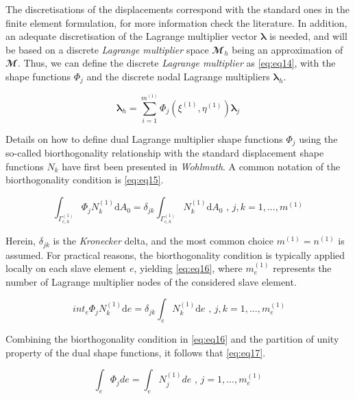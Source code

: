 \documentclass[a4paper,10pt]{article} %
\begin{document}
The discretisations of the displacements correspond with the standard ones in the finite element formulation, for more information check the literature\cite{Zienkiewicz1}. In addition, an adequate discretisation of the Lagrange multiplier vector $\boldsymbol{\lambda}$ is needed, and will be based on a discrete \textit{Lagrange multiplier} space $\mathbfcal{M}_h$ being an approximation of $\mathbfcal{M}$. Thus, we can define the discrete \textit{Lagrange multiplier} as \eqref{eq:eq14}, with the shape functions $\Phi_j$ and the discrete nodal Lagrange multipliers $\boldsymbol{\lambda}_h$.

\begin{equation}\label{eq:eq14}
    \boldsymbol{\lambda}_h = \sum_{i=1}^{m^{(1)}} \Phi_j\left(\xi^{(1)},\eta^{(1)} \right) \boldsymbol{\lambda}_j
\end{equation}

Details on how to define dual Lagrange multiplier shape functions $\Phi_j$ using the so-called biorthogonality relationship with the standard displacement shape functions $N_k$ have first been presented in \textit{Wohlmuth}\cite{wohlmuth}. A common notation of the biorthogonality condition is \eqref{eq:eq15}.

\begin{equation}\label{eq:eq15}
    \int_{\Gamma_{c,h}^{(1)}}\Phi_j N_k^{(1)} \text{d}A_0 = \delta_{jk} \int_{\Gamma_{c,h}^{(1)}} N_k^{(1)} \text{d}A_0 \text{ , } j,k=1,...,m^{(1)}
\end{equation}

Herein, $\delta_{jk}$ is the \textit{Kronecker} delta, and the most common choice $m^{(1)} = n^{(1)}$ is assumed. For
practical reasons, the biorthogonality condition is typically applied locally on each slave element $e$, yielding \eqref{eq:eq16}, where $m_e^{(1)}$ represents the number of Lagrange multiplier nodes of the considered slave element.

\begin{equation}\label{eq:eq16}
\   int_{e}\Phi_j N_k^{(1)} \text{d}e = \delta_{jk} \int_{e} N_k^{(1)} \text{d}e \text{ , } j,k=1,...,m_e^{(1)}
\end{equation}

Combining the biorthogonality condition in \eqref{eq:eq16} and the partition of unity property of the dual shape functions, it follows that \eqref{eq:eq17}.

\begin{equation}\label{eq:eq17}
    \int_e \Phi_j de =  \int_e N_j^{(1)} de \text{ , } j=1,...,m_e^{(1)}
\end{equation}
\end{document}
